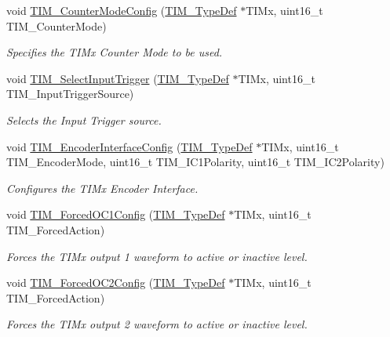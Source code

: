 \begin{DoxyCompactItemize}
void \mbox{\hyperlink{group___t_i_m___private___functions_ga93941c1db20bf3794f377307df90a67b}{T\+I\+M\+\_\+\+Counter\+Mode\+Config}} (\mbox{\hyperlink{struct_t_i_m___type_def}{T\+I\+M\+\_\+\+Type\+Def}} $\ast$T\+I\+Mx, uint16\+\_\+t T\+I\+M\+\_\+\+Counter\+Mode)
\begin{DoxyCompactList}\small\item\em Specifies the T\+I\+Mx Counter Mode to be used. \end{DoxyCompactList}\item 
void \mbox{\hyperlink{group___t_i_m___private___functions_ga4252583c6ae8a73d6fc66f7e951dbc35}{T\+I\+M\+\_\+\+Select\+Input\+Trigger}} (\mbox{\hyperlink{struct_t_i_m___type_def}{T\+I\+M\+\_\+\+Type\+Def}} $\ast$T\+I\+Mx, uint16\+\_\+t T\+I\+M\+\_\+\+Input\+Trigger\+Source)
\begin{DoxyCompactList}\small\item\em Selects the Input Trigger source. \end{DoxyCompactList}\item 
void \mbox{\hyperlink{group___t_i_m___private___functions_ga0fc7e76c47a3bd1ba1ebc71427832b51}{T\+I\+M\+\_\+\+Encoder\+Interface\+Config}} (\mbox{\hyperlink{struct_t_i_m___type_def}{T\+I\+M\+\_\+\+Type\+Def}} $\ast$T\+I\+Mx, uint16\+\_\+t T\+I\+M\+\_\+\+Encoder\+Mode, uint16\+\_\+t T\+I\+M\+\_\+\+I\+C1\+Polarity, uint16\+\_\+t T\+I\+M\+\_\+\+I\+C2\+Polarity)
\begin{DoxyCompactList}\small\item\em Configures the T\+I\+Mx Encoder Interface. \end{DoxyCompactList}\item 
void \mbox{\hyperlink{group___t_i_m___private___functions_ga4f58c12e6493a0d8b9555c9097b831d6}{T\+I\+M\+\_\+\+Forced\+O\+C1\+Config}} (\mbox{\hyperlink{struct_t_i_m___type_def}{T\+I\+M\+\_\+\+Type\+Def}} $\ast$T\+I\+Mx, uint16\+\_\+t T\+I\+M\+\_\+\+Forced\+Action)
\begin{DoxyCompactList}\small\item\em Forces the T\+I\+Mx output 1 waveform to active or inactive level. \end{DoxyCompactList}\item 
void \mbox{\hyperlink{group___t_i_m___private___functions_ga3d2902b6fbab8dd55cd531055ffcc63d}{T\+I\+M\+\_\+\+Forced\+O\+C2\+Config}} (\mbox{\hyperlink{struct_t_i_m___type_def}{T\+I\+M\+\_\+\+Type\+Def}} $\ast$T\+I\+Mx, uint16\+\_\+t T\+I\+M\+\_\+\+Forced\+Action)
\begin{DoxyCompactList}\small\item\em Forces the T\+I\+Mx output 2 waveform to active or inactive level. \end{DoxyCompactList}\item 

\end{DoxyCompactItemize}
